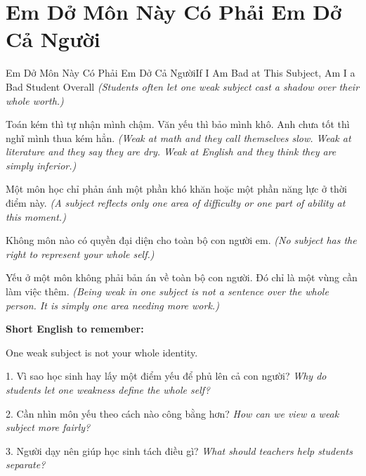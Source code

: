 \section{Em Dở Môn Này Có Phải Em Dở Cả Người}
\begin{truyen}{Em Dở Môn Này Có Phải Em Dở Cả Người}{If I Am Bad at This Subject, Am I a Bad Student Overall}
\textit{(Students often let one weak subject cast a shadow over their whole worth.)}

Toán kém thì tự nhận mình chậm. Văn yếu thì bảo mình khô. Anh chưa tốt thì nghĩ mình thua kém hẳn.
\textit{(Weak at math and they call themselves slow. Weak at literature and they say they are dry. Weak at English and they think they are simply inferior.)}

Một môn học chỉ phản ánh một phần khó khăn hoặc một phần năng lực ở thời điểm này.
\textit{(A subject reflects only one area of difficulty or one part of ability at this moment.)}

Không môn nào có quyền đại diện cho toàn bộ con người em.
\textit{(No subject has the right to represent your whole self.)}
\end{truyen}

\begin{baihoc}
Yếu ở một môn không phải bản án về toàn bộ con người. Đó chỉ là một vùng cần làm việc thêm.
\textit{(Being weak in one subject is not a sentence over the whole person. It is simply one area needing more work.)}
\end{baihoc}

\begin{ghinhoanh}
\textbf{Short English to remember:}

One weak subject is not your whole identity.

\end{ghinhoanh}

\begin{tuhocnhanh}
1. Vì sao học sinh hay lấy một điểm yếu để phủ lên cả con người? \textit{Why do students let one weakness define the whole self?}

2. Cần nhìn môn yếu theo cách nào công bằng hơn? \textit{How can we view a weak subject more fairly?}

3. Người dạy nên giúp học sinh tách điều gì? \textit{What should teachers help students separate?}
\end{tuhocnhanh}
\ngancach

